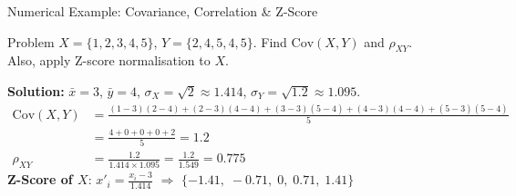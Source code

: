 \begin{frame}{Numerical Example: Covariance, Correlation \& Z-Score}
\begin{exampleblock}{Problem}
$X=\{1,2,3,4,5\}$, $Y=\{2,4,5,4,5\}$. Find $\mathrm{Cov}(X,Y)$ and $\rho_{XY}$.\\
Also, apply Z-score normalisation to $X$.
\end{exampleblock}
\textbf{Solution:} $\bar{x}=3$, $\bar{y}=4$, $\sigma_X=\sqrt{2}\approx1.414$, $\sigma_Y=\sqrt{1.2}\approx1.095$.
\begin{align*}
\mathrm{Cov}(X,Y) &= \frac{(1\!-\!3)(2\!-\!4)+(2\!-\!3)(4\!-\!4)+(3\!-\!3)(5\!-\!4)+(4\!-\!3)(4\!-\!4)+(5\!-\!3)(5\!-\!4)}{5}\\
&= \frac{4+0+0+0+2}{5} = \mathbf{1.2}\\[4pt]
\rho_{XY} &= \frac{1.2}{1.414 \times 1.095} = \frac{1.2}{1.549} = \mathbf{0.775}
\end{align*}
\textbf{Z-Score of $X$}: $x'_i = \frac{x_i - 3}{1.414}$ $\Rightarrow$ $\{-1.41,\;-0.71,\;0,\;0.71,\;1.41\}$
\end{frame}
